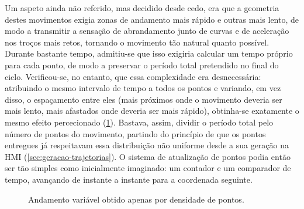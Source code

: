 Um aspeto ainda não referido, mas decidido desde cedo, era que a geometria destes movimentos exigia zonas de andamento mais rápido e outras mais lento, de modo a transmitir a sensação de abrandamento junto de curvas e de aceleração nos troços mais retos, tornando o movimento tão natural quanto possível. Durante bastante tempo, admitiu-se que isso exigiria calcular um tempo próprio para cada ponto, de modo a preservar o período total pretendido no final do ciclo. Verificou-se, no entanto, que essa complexidade era desnecessária: atribuindo o mesmo intervalo de tempo a todos os pontos e variando, em vez disso, o espaçamento entre eles (mais próximos onde o movimento deveria ser mais lento, mais afastados onde deveria ser mais rápido), obtinha-se exatamente o mesmo efeito percecionado (\cref{fig:densidade-pontos-velocidade}). Bastava, assim, dividir o período total pelo número de pontos do movimento, partindo do princípio de que os pontos entregues já respeitavam essa distribuição não uniforme desde a sua geração na HMI (\cref{sec:geracao-trajetorias}). O sistema de atualização de pontos podia então ser tão simples como inicialmente imaginado: um contador e um comparador de tempo, avançando de instante a instante para a coordenada seguinte.

\begin{figure}[h]
  \centering
  \caption{Andamento variável obtido apenas por densidade de pontos.}
  \label{fig:densidade-pontos-velocidade}
\end{figure}

